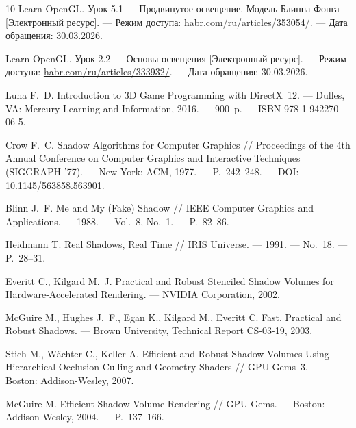 \documentclass[a4paper, 12pt]{article}
\begin{document}
\begin{thebibliography}{10}
	 Learn OpenGL. Урок 5.1 --- Продвинутое освещение. Модель Блинна-Фонга [Электронный ресурс]. --- Режим доступа: \href{https://habr.com/ru/articles/353054/}{habr.com/ru/articles/353054/}. --- Дата обращения: 30.03.2026.
	
	 Learn OpenGL. Урок 2.2 --- Основы освещения [Электронный ресурс]. --- Режим доступа: \href{https://habr.com/ru/articles/333932/}{habr.com/ru/articles/333932/}. --- Дата обращения: 30.03.2026.
	
	 Luna F.~D. Introduction to 3D Game Programming with DirectX~12. --- Dulles, VA: Mercury Learning and Information, 2016. --- 900~p. --- ISBN 978-1-942270-06-5.
	
	 Crow F.~C. Shadow Algorithms for Computer Graphics // Proceedings of the 4th Annual Conference on Computer Graphics and Interactive Techniques (SIGGRAPH '77). --- New York: ACM, 1977. --- P.~242--248. --- DOI: 10.1145/563858.563901.
	
	 Blinn J.~F. Me and My (Fake) Shadow // IEEE Computer Graphics and Applications. --- 1988. --- Vol.~8, No.~1. --- P.~82--86.
	
	 Heidmann T. Real Shadows, Real Time // IRIS Universe. --- 1991. --- No.~18. --- P.~28--31.
	
	 Everitt C., Kilgard M.~J. Practical and Robust Stenciled Shadow Volumes for Hardware-Accelerated Rendering. --- NVIDIA Corporation, 2002.
	
	 McGuire M., Hughes J.~F., Egan K., Kilgard M., Everitt C. Fast, Practical and Robust Shadows. --- Brown University, Technical Report CS-03-19, 2003.
	
	 Stich M., W\"achter C., Keller A. Efficient and Robust Shadow Volumes Using Hierarchical Occlusion Culling and Geometry Shaders // GPU Gems~3. --- Boston: Addison-Wesley, 2007.
	
	 McGuire M. Efficient Shadow Volume Rendering // GPU Gems. --- Boston: Addison-Wesley, 2004. --- P.~137--166.
\end{thebibliography}
\end{document}
